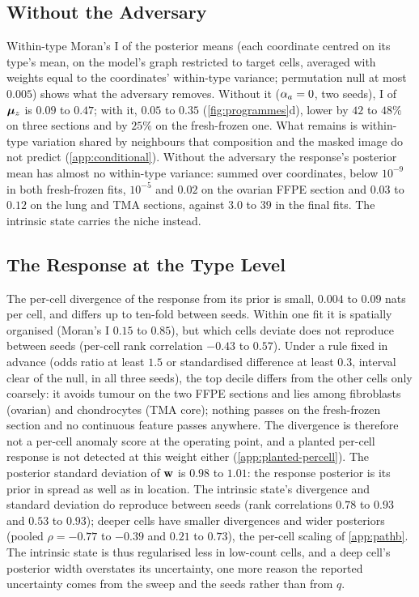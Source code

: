 \subsection{Without the Adversary}
\label{app:moran}

Within-type Moran's I of the posterior means (each coordinate centred on its type's mean, on the model's graph restricted to target cells, averaged with weights equal to the coordinates' within-type variance; permutation null at most $0.005$) shows what the adversary removes. Without it ($\alpha_a = 0$, two seeds), I of $\boldsymbol{\mu}_z$ is $0.09$ to $0.47$; with it, $0.05$ to $0.35$ (\cref{fig:programmes}d), lower by $42$ to $48\%$ on three sections and by $25\%$ on the fresh-frozen one. What remains is within-type variation shared by neighbours that composition and the masked image do not predict (\cref{app:conditional}). Without the adversary the response's posterior mean has almost no within-type variance: summed over coordinates, below $10^{-9}$ in both fresh-frozen fits, $10^{-5}$ and $0.02$ on the ovarian FFPE section and $0.03$ to $0.12$ on the lung and TMA sections, against $3.0$ to $39$ in the final fits. The intrinsic state carries the niche instead.

\subsection{The Response at the Type Level}
\label{app:kl-maps}

The per-cell divergence of the response from its prior is small, $0.004$ to $0.09$ nats per cell, and differs up to ten-fold between seeds. Within one fit it is spatially organised (Moran's I $0.15$ to $0.85$), but which cells deviate does not reproduce between seeds (per-cell rank correlation $-0.43$ to $0.57$). Under a rule fixed in advance (odds ratio at least $1.5$ or standardised difference at least $0.3$, interval clear of the null, in all three seeds), the top decile differs from the other cells only coarsely: it avoids tumour on the two FFPE sections and lies among fibroblasts (ovarian) and chondrocytes (TMA core); nothing passes on the fresh-frozen section and no continuous feature passes anywhere. The divergence is therefore not a per-cell anomaly score at the operating point, and a planted per-cell response is not detected at this weight either (\cref{app:planted-percell}). The posterior standard deviation of $\mathbf{w}$ is $0.98$ to $1.01$: the response posterior is its prior in spread as well as in location. The intrinsic state's divergence and standard deviation do reproduce between seeds (rank correlations $0.78$ to $0.93$ and $0.53$ to $0.93$); deeper cells have smaller divergences and wider posteriors (pooled $\rho = -0.77$ to $-0.39$ and $0.21$ to $0.73$), the per-cell scaling of \cref{app:pathb}. The intrinsic state is thus regularised less in low-count cells, and a deep cell's posterior width overstates its uncertainty, one more reason the reported uncertainty comes from the sweep and the seeds rather than from $q$.

